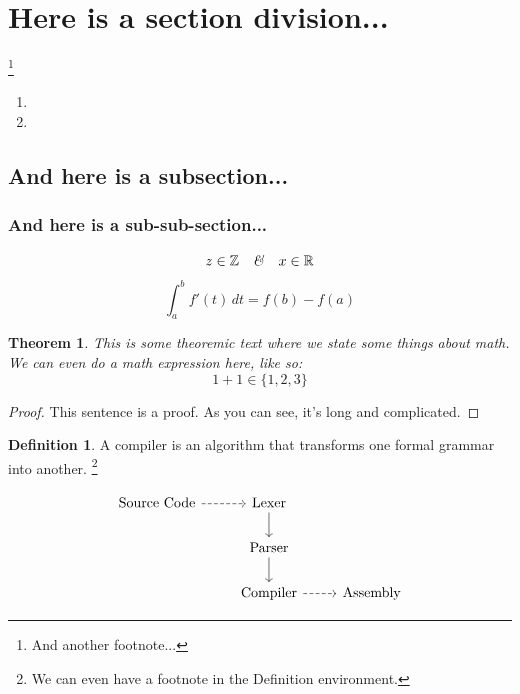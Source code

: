 \documentclass[letterpaper,
               extrafontsizes,
               11pt,
               oneside,
               final]{memoir}   %
\theoremstyle{plain}                        %
\newtheorem{thm}{Theorem}
\theoremstyle{definition}
\newtheorem{dfn}{Definition}[section]
\theoremstyle{remark}
\begin{document}
 \section{Here is a section division...}
 \lipsum[6]\footnote{And another footnote...}
 \begin{enumerate}
   \item \lipsum[7]
   \item \lipsum[8]
 \end{enumerate}

 \subsection{And here is a subsection...}
 \lipsum[9]

 \subsubsection{And here is a sub-sub-section...}
 \lipsum[10]            %
 \[  z \in \mathbb{Z} \quad\text{\textit{\&}}\quad x \in \mathbb{R} \]
 \[ \int_a^b f'(t)\,dt = f(b) - f(a) \]
 \begin{thm}
  This is some theoremic text where we state some things about math. We can even do a math
  expression here, like so:
  \[ 1 + 1 \in \{1,2,3\} \]
 \end{thm}
 \begin{proof}
   This sentence is a proof. As you can see, it's long and complicated.
 \end{proof}
 \begin{dfn}
  A compiler is an algorithm that transforms one formal grammar into another.
  \footnote{We can even have a footnote in the Definition environment.}
 \end{dfn}
 \[
 \begin{tikzcd}
     {\text{Source Code}} & {\text{Lexer}} \\
     & {\text{Parser}} \\
     & {\text{Compiler}} & {\text{Assembly}}
     \arrow[dashed, from=1-1, to=1-2]
     \arrow[from=1-2, to=2-2]
     \arrow[from=2-2, to=3-2]
     \arrow[dashed, from=3-2, to=3-3]
 \end{tikzcd}
 \]

\end{document}
